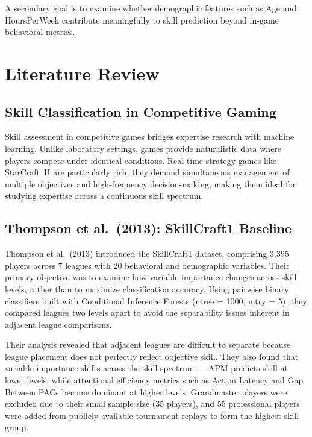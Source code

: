 \documentclass[12pt, a4paper]{article}
\begin{document}
A secondary goal is to examine whether demographic features such as Age and HoursPerWeek
contribute meaningfully to skill prediction beyond in-game behavioral metrics.


\section{Literature Review}

\subsection{Skill Classification in Competitive Gaming}

Skill assessment in competitive games bridges expertise research with machine learning.
Unlike laboratory settings, games provide naturalistic data where players compete under
identical conditions. Real-time strategy games like StarCraft~II are particularly rich:
they demand simultaneous management of multiple objectives and high-frequency
decision-making, making them ideal for studying expertise across a continuous skill
spectrum.

\subsection{Thompson et al.\ (2013): SkillCraft1 Baseline}

Thompson et al.\ (2013) introduced the SkillCraft1 dataset, comprising 3,395 players
across 7 leagues with 20 behavioral and demographic variables. Their primary objective
was to examine how variable importance changes across skill levels, rather than to
maximize classification accuracy. Using pairwise binary classifiers built with
Conditional Inference Forests (ntree = 1000, mtry = 5), they compared leagues two
levels apart to avoid the separability issues inherent in adjacent league comparisons.

Their analysis revealed that adjacent leagues are difficult to separate because league
placement does not perfectly reflect objective skill. They also found that variable
importance shifts across the skill spectrum --- APM predicts skill at lower levels, while
attentional efficiency metrics such as Action Latency and Gap Between PACs become
dominant at higher levels. Grandmaster players were excluded due to their small sample
size (35 players), and 55 professional players were added from publicly available
tournament replays to form the highest skill group.
\end{document}
